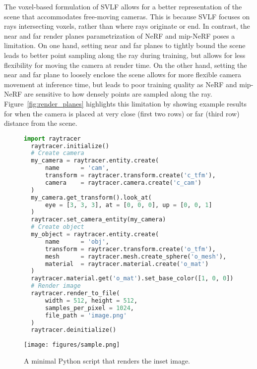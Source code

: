 The voxel-based formulation of SVLF allows for a better representation of the scene that accommodates free-moving cameras.
This is because SVLF focuses on rays intersecting voxels, rather than where rays originate or end.
In contrast, the near and far render planes parametrization of NeRF and mip-NeRF poses a limitation.
On one hand, setting near and far planes to tightly bound the scene leads to better point sampling along the ray during training,
but allows for less flexibility for moving the camera at render time.
On the other hand, setting the near and far plane to loosely enclose the scene allows for more flexible camera movement at inference time,
but leads to poor training quality as NeRF and mip-NeRF are sensitive to how densely points are sampled along the ray.
Figure~\ref{fig:render_planes} highlights this limitation
by showing example results for when the camera is placed at very close (first two rows) or far (third row) distance from the scene.

\begin{figure}
\begin{lstlisting}[language=Python]
  import raytracer 
  raytracer.initialize()
  # Create camera
  my_camera = raytracer.entity.create(
      name      = 'cam',
      transform = raytracer.transform.create('c_tfm'),
      camera    = raytracer.camera.create('c_cam')
  )
  my_camera.get_transform().look_at(
      eye = [3, 3, 3], at = [0, 0, 0], up = [0, 0, 1]
  )
  raytracer.set_camera_entity(my_camera)
  # Create object
  my_object = raytracer.entity.create(
      name      = 'obj', 
      transform = raytracer.transform.create('o_tfm'),
      mesh      = raytracer.mesh.create_sphere('o_mesh'),
      material  = raytracer.material.create('o_mat')
  )
  raytracer.material.get('o_mat').set_base_color([1, 0, 0])
  # Render image
  raytracer.render_to_file(
      width = 512, height = 512, 
      samples_per_pixel = 1024, 
      file_path = 'image.png'
  )
  raytracer.deinitialize()
\end{lstlisting}
\vspace*{-5.5em}
\raggedleft\texttt{[image: figures/sample.png]}\hspace{.1em}
\caption{A minimal Python script that renders the inset image.}
\label{fig:nvisii}
\end{figure}


